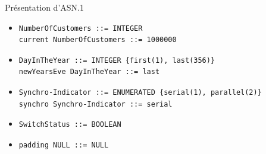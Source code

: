



\begin{slide}
\begin{block} {Présentation d'ASN.1} \end{block}


\begin{itemize}
  \item
\begin{verbatim}
NumberOfCustomers ::= INTEGER
current NumberOfCustomers ::= 1000000
\end{verbatim}

  \item
\begin{verbatim}
DayInTheYear ::= INTEGER {first(1), last(356)}
newYearsEve DayInTheYear ::= last
\end{verbatim}


  \item
\begin{verbatim}
Synchro-Indicator ::= ENUMERATED {serial(1), parallel(2)}
synchro Synchro-Indicator ::= serial
\end{verbatim}


  \item
\begin{verbatim}
SwitchStatus ::= BOOLEAN
\end{verbatim}


  \item
\begin{verbatim}
padding NULL ::= NULL
\end{verbatim}

\end{itemize}

\end{slide}


